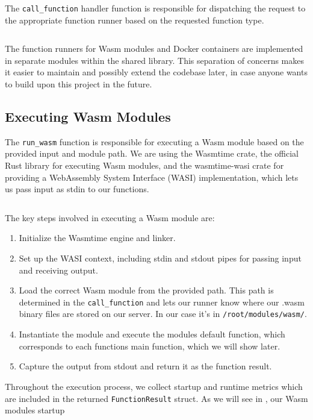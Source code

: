 \documentclass[
  table]{report}
\providecommand{\tightlist}{%
  \setlength{\itemsep}{0pt}\setlength{\parskip}{0pt}}
\begin{document}
\inputminted{rust}{assets/code/nebula_types.rs}

The \texttt{call\_function} handler function is responsible for
dispatching the request to the appropriate function runner based on the
requested function type.

\inputminted{rust}{assets/code/call_function.rs}

The function runners for Wasm modules and Docker containers are
implemented in separate modules within the shared library. This
separation of concerns makes it easier to maintain and possibly extend
the codebase later, in case anyone wants to build upon this project in
the future.

\subsection{Executing \ac{Wasm} Modules}

The \texttt{run\_wasm} function is responsible for executing a Wasm
module based on the provided input and module path. We are using the
Wasmtime crate, the official Rust library for executing Wasm modules,
and the wasmtime-wasi crate for providing a WebAssembly System Interface
(WASI) implementation, which lets us pass input as stdin to our
functions.

\inputminted{rust}{assets/code/wasm_runner.rs}

The key steps involved in executing a Wasm module are:

\begin{enumerate}
\def\labelenumi{\arabic{enumi}.}
\tightlist
\item
  Initialize the Wasmtime engine and linker.
\item
  Set up the WASI context, including stdin and stdout pipes for passing
  input and receiving output.
\item
  Load the correct Wasm module from the provided path. This path is
  determined in the \texttt{call\_function} and lets our runner know
  where our .wasm binary files are stored on our server. In our case
  it's in \texttt{/root/modules/wasm/}.
\item
  Instantiate the module and execute the modules default function, which
  corresponds to each functions main function, which we will show later.
\item
  Capture the output from stdout and return it as the function result.
\end{enumerate}

Throughout the execution process, we collect startup and runtime metrics
which are included in the returned \texttt{FunctionResult} struct. As we
will see in , our \ac{Wasm} modules startup
\end{document}

